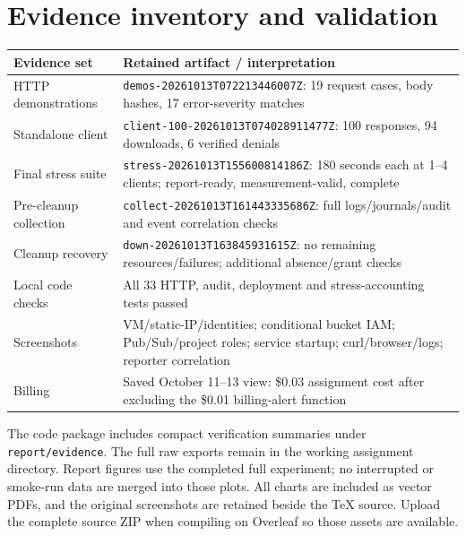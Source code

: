 \documentclass[11pt,letterpaper]{article}
\newcommand{\code}[1]{\texttt{\small #1}}
\newcommand{\newreportpage}[1]{\clearpage\section{#1}}
\begin{document}
\newreportpage{Evidence inventory and validation}
\small
\begin{tabularx}{\linewidth}{@{}p{1.65in}Y@{}}\toprule
Evidence set & Retained artifact / interpretation \\ \midrule
HTTP demonstrations & \nolinkurl{demos-20261013T072213446007Z}: 19 request cases, body hashes, 17 error-severity matches \\
Standalone client & \nolinkurl{client-100-20261013T074028911477Z}: 100 responses, 94 downloads, 6 verified denials \\
Final stress suite & \nolinkurl{stress-20261013T155600814186Z}: 180 seconds each at 1--4 clients; report-ready, measurement-valid, complete \\
Pre-cleanup collection & \nolinkurl{collect-20261013T161443335686Z}: full logs/journals/audit and event correlation checks \\
Cleanup recovery & \nolinkurl{down-20261013T163845931615Z}: no remaining resources/failures; additional absence/grant checks \\
Local code checks & All 33 HTTP, audit, deployment and stress-accounting tests passed \\
Screenshots & VM/static-IP/identities; conditional bucket IAM; Pub/Sub/project roles; service startup; curl/browser/logs; reporter correlation \\
Billing & Saved October 11--13 view: \$0.03 assignment cost after excluding the \$0.01 billing-alert function \\
\bottomrule\end{tabularx}
\normalsize
The code package includes compact verification summaries under \code{report/evidence}.
The full raw exports remain in the working assignment directory. Report figures use the
completed full experiment; no interrupted or smoke-run data are merged into those plots.
All charts are included as vector PDFs, and the original screenshots are retained beside
the TeX source. Upload the complete source ZIP when compiling on Overleaf so those assets
are available.
\end{document}
